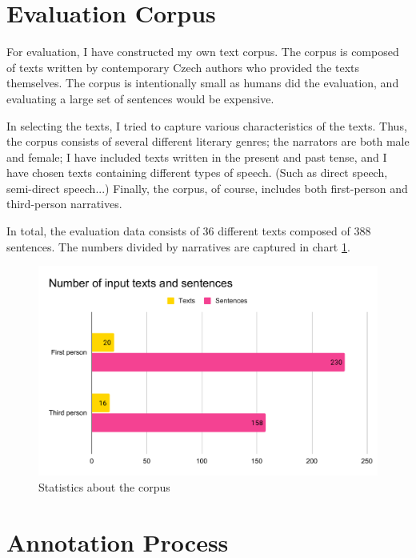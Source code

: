 
\section{Evaluation Corpus}

For evaluation, I have constructed my own text corpus. The corpus is composed of texts written by contemporary Czech authors who provided the texts themselves. The corpus is intentionally small as humans did the evaluation, and evaluating a large set of sentences would be expensive.

In selecting the texts, I tried to capture various characteristics of the texts. Thus, the corpus consists of several different literary genres; the narrators are both male and female; I have included texts written in the present and past tense, and I have chosen texts containing different types of speech. (Such as direct speech, semi-direct speech...) Finally, the corpus, of course, includes both first-person and third-person narratives.

In total, the evaluation data consists of 36 different texts composed of 388 sentences. The numbers divided by narratives are captured in chart \ref{fig:eval-input-numbers}.

\begin{figure}[!ht]
\includegraphics[width=\textwidth]{data/Eval-Input-Numbers.pdf}
\caption{Statistics about the corpus}
\label{fig:eval-input-numbers}
\end{figure}

\section{Annotation Process}

